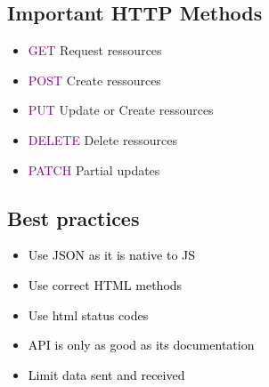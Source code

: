 \documentclass[main.tex,fontsize=6pt,paper=a4,paper=landscape,DIV=calc,]{scrartcl}
\begin{document}
\begin{multicols*}{4}
\subsection{Important HTTP Methods}  
\begin{itemize}
\item \textcolor{purple}{GET}\newline
  Request ressources
\item \textcolor{purple}{POST}\newline
  Create ressources
\item \textcolor{purple}{PUT}\newline
  Update or Create ressources
\item \textcolor{purple}{DELETE}\newline
  Delete ressources
\item \textcolor{purple}{PATCH}\newline
  Partial updates
\end{itemize} 

\subsection{Best practices}  
\begin{itemize}
\item \textcolor{black}{Use JSON as it is native to JS}
\item \textcolor{black}{Use correct HTML methods}
\item \textcolor{black}{Use html status codes}
\item \textcolor{black}{API is only as good as its documentation}
\item \textcolor{black}{Limit data sent and received}
\end{itemize} 


\end{multicols*}
\end{document}
